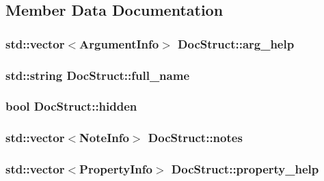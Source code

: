 \subsection{Member Data Documentation}
\hypertarget{structDocStruct_aaf770bc3b8bbe01f8a0a0e859fdf0c92}{
\subsubsection[{arg\-\_\-help}]{\setlength{\rightskip}{0pt plus 5cm}std\-::vector$<${\bf Argument\-Info}$>$ Doc\-Struct\-::arg\-\_\-help}}\label{structDocStruct_aaf770bc3b8bbe01f8a0a0e859fdf0c92}
\hypertarget{structDocStruct_ab8f7dbf05b414a94c4378b783270cf1e}{
\subsubsection[{full\-\_\-name}]{\setlength{\rightskip}{0pt plus 5cm}std\-::string Doc\-Struct\-::full\-\_\-name}}\label{structDocStruct_ab8f7dbf05b414a94c4378b783270cf1e}
\hypertarget{structDocStruct_af440a5475a918a0ab6cac5ea7dc38421}{
\subsubsection[{hidden}]{\setlength{\rightskip}{0pt plus 5cm}bool Doc\-Struct\-::hidden}}\label{structDocStruct_af440a5475a918a0ab6cac5ea7dc38421}
\hypertarget{structDocStruct_a511a4d9eac3411c758b2ea6817421692}{
\subsubsection[{notes}]{\setlength{\rightskip}{0pt plus 5cm}std\-::vector$<${\bf Note\-Info}$>$ Doc\-Struct\-::notes}}\label{structDocStruct_a511a4d9eac3411c758b2ea6817421692}
\hypertarget{structDocStruct_a9eb6464706fd52b152dd73560919b41b}{
\subsubsection[{property\-\_\-help}]{\setlength{\rightskip}{0pt plus 5cm}std\-::vector$<${\bf Property\-Info}$>$ Doc\-Struct\-::property\-\_\-help}}\label{structDocStruct_a9eb6464706fd52b152dd73560919b41b}

